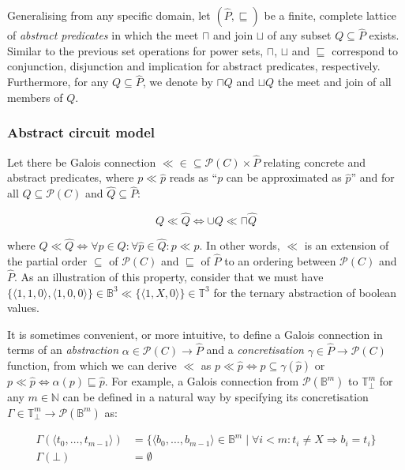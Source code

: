 Generalising from any specific domain, let $(\hat P,\sqsubseteq)$ be a finite, complete lattice of \textit{abstract predicates} in which the meet $\sqcap$ and join $\sqcup$ of any subset $Q \subseteq \hat P$ exists. Similar to the previous set operations for power sets, $\sqcap$, $\sqcup$ and $\sqsubseteq$ correspond to conjunction, disjunction and implication for abstract predicates, respectively. Furthermore, for any $Q \subseteq \hat P$, we denote by $\sqcap Q$ and $\sqcup Q$ the meet and join of all members of $Q$.

\subsubsection{Abstract circuit model}

Let there be Galois connection $\ll \in \left. \subseteq \mathcal{P}(C) \times \hat P \right.$ relating concrete and abstract predicates, where $p \ll \hat p$ reads as ``$p$ can be approximated as $\hat p$'' and for all $Q \subseteq \mathcal{P}(C)$ and $\hat Q \subseteq \hat P$:

\begin{equation*}
Q \ll \hat Q \iff \cup Q \ll \sqcap \hat Q
\end{equation*}

\noindent where $Q \ll \hat Q \iff \forall p \in Q : \forall \hat p \in \hat Q : p \ll \hat p$. In other words, $\ll$ is an extension of the partial order $\subseteq$ of $\mathcal{P}(C)$ and $\sqsubseteq$ of $\hat P$ to an ordering between $\mathcal{P}(C)$ and $\hat P$. As an illustration of this property, consider that we must have $\{ \langle 1,1,0 \rangle, \langle 1,0,0 \rangle \} \in \mathbb{B}^{3} \ll \{ \langle 1,X,0  \rangle \} \in \mathbb{T}^{3}$ for the ternary abstraction of boolean values.

It is sometimes convenient, or more intuitive, to define a Galois connection in terms of an \textit{abstraction} $\alpha \in \mathcal{P}(C) \rightarrow \hat P$ and a \textit{concretisation} $\gamma \in \hat P \rightarrow \mathcal{P}(C)$ function, from which we can derive $\ll$ as $p \ll \hat p \iff p \subseteq \gamma(\hat p)$ or $p \ll \hat p \iff \alpha (p) \sqsubseteq \hat p$. For example, a Galois connection from $\mathcal{P}(\mathbb{B}^{m})$ to $\mathbb{T}_{\bot}^{m}$ for any $m \in \mathbb{N}$ can be defined in a natural way by specifying its concretisation $\Gamma \in \mathbb{T}_{\bot}^{m} \rightarrow \mathcal{P}(\mathbb{B}^{m})$ as:

\begin{align*}
\Gamma ( \langle t_{0},\dots,t_{m-1} \rangle ) &= \{ \langle b_{0},\dots,b_{m-1} \rangle \in \mathbb{B}^{m} \mid \forall i < m : t_{i} \neq X \Rightarrow b_{i} = t_{i} \} \\
\Gamma ( \bot ) &= \emptyset
\end{align*}

